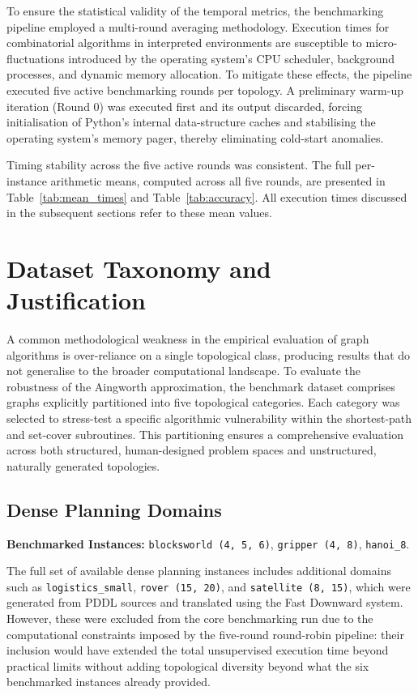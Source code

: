 To ensure the statistical validity of the temporal metrics, the benchmarking pipeline employed a multi-round averaging methodology. Execution times for combinatorial algorithms in interpreted environments are susceptible to micro-fluctuations introduced by the operating system's CPU scheduler, background processes, and dynamic memory allocation. To mitigate these effects, the pipeline executed five active benchmarking rounds per topology. A preliminary warm-up iteration (Round 0) was executed first and its output discarded, forcing initialisation of Python's internal data-structure caches and stabilising the operating system's memory pager, thereby eliminating cold-start anomalies.

Timing stability across the five active rounds was consistent. The full per-instance arithmetic means, computed across all five rounds, are presented in Table~\ref{tab:mean_times} and Table~\ref{tab:accuracy}. All execution times discussed in the subsequent sections refer to these mean values.

\section{Dataset Taxonomy and Justification}
\label{sec:taxonomy}

A common methodological weakness in the empirical evaluation of graph algorithms is over-reliance on a single topological class, producing results that do not generalise to the broader computational landscape. To evaluate the robustness of the Aingworth approximation, the benchmark dataset comprises graphs explicitly partitioned into five topological categories. Each category was selected to stress-test a specific algorithmic vulnerability within the shortest-path and set-cover subroutines. This partitioning ensures a comprehensive evaluation across both structured, human-designed problem spaces and unstructured, naturally generated topologies.

\subsection{Dense Planning Domains}

\textbf{Benchmarked Instances:} \texttt{blocksworld (4, 5, 6)}, \texttt{gripper (4, 8)}, \texttt{hanoi\_8}.

The full set of available dense planning instances includes additional domains such as \texttt{logistics\_small}, \texttt{rover (15, 20)}, and \texttt{satellite (8, 15)}, which were generated from PDDL sources and translated using the Fast Downward system. However, these were excluded from the core benchmarking run due to the computational constraints imposed by the five-round round-robin pipeline: their inclusion would have extended the total unsupervised execution time beyond practical limits without adding topological diversity beyond what the six benchmarked instances already provided.

